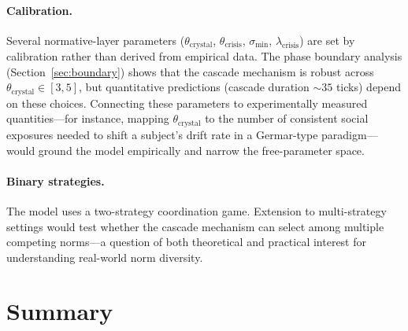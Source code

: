 \documentclass[11pt,a4paper]{article}
\begin{document}
\paragraph{Calibration.}  Several normative-layer parameters ($\theta_{\mathrm{crystal}}$, $\theta_{\mathrm{crisis}}$, $\sigma_{\min}$, $\lambda_{\mathrm{crisis}}$) are set by calibration rather than derived from empirical data.  The phase boundary analysis (Section~\ref{sec:boundary}) shows that the cascade mechanism is robust across $\theta_{\mathrm{crystal}} \in [3, 5]$, but quantitative predictions (cascade duration ${\sim}35$ ticks) depend on these choices.  Connecting these parameters to experimentally measured quantities---for instance, mapping $\theta_{\mathrm{crystal}}$ to the number of consistent social exposures needed to shift a subject's drift rate in a Germar-type paradigm---would ground the model empirically and narrow the free-parameter space.

\paragraph{Binary strategies.}  The model uses a two-strategy coordination game.  Extension to multi-strategy settings would test whether the cascade mechanism can select among multiple competing norms---a question of both theoretical and practical interest for understanding real-world norm diversity.

\section{Summary}
\label{sec:summary}
\end{document}
